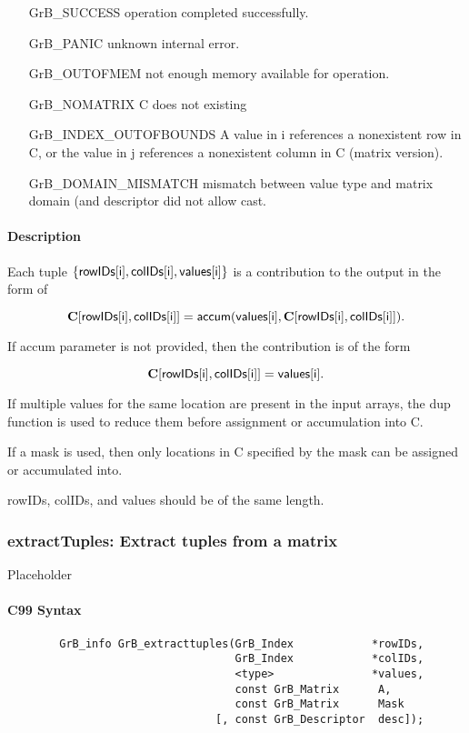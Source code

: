 \begin{itemize}[leftmargin=2.1in]
\item[{\sf GrB\_SUCCESS}] 	operation completed successfully.
\item[{\sf GrB\_PANIC}]	    unknown internal error.
\item[{\sf GrB\_OUTOFMEM}]	not enough memory available for operation.
\item[{\sf GrB\_NOMATRIX}]  C does not existing
\item[{\sf GrB\_INDEX\_OUTOFBOUNDS}]
        A value in i references a nonexistent row in C, or
	    the value in j references a nonexistent column in C (matrix version).
\item[\sf GrB\_DOMAIN\_MISMATCH]  
	   mismatch between value type and matrix domain (and descriptor did not allow cast.
\end{itemize}


\paragraph{Description}
Each tuple $\{ {\sf rowIDs[i]}, {\sf colIDs[i]}, {\sf values[i]}\}$ is a contribution to the output in the form of 

$${\bf C}[{\sf rowIDs[i]},{\sf colIDs[i]}] = {\sf accum}({\sf values[i]}, {\bf C}[{\sf rowIDs[i]}, {\sf colIDs[i]}]).$$

If {\sf accum} parameter is not provided, then the contribution is of the form 

$${\bf C}[{\sf rowIDs[i]}, {\sf colIDs[i]}] = {\sf values[i]}.$$

If multiple values for the same location are present in the input arrays, the 
dup function is used to reduce them before assignment or accumulation into {\sf C}.

If a mask is used, then only locations in {\sf C} specified by the mask can be assigned or
accumulated into.
 
{\sf rowIDs}, {\sf colIDs}, and {\sf values} should be of the same length. 


\subsubsection{{\sf extractTuples}: Extract tuples from a matrix}
\label{Sec:extractTuples}

Placeholder


\paragraph{C99 Syntax}

\begin{verbatim}
        GrB_info GrB_extracttuples(GrB_Index            *rowIDs,
                                   GrB_Index            *colIDs,
                                   <type>               *values, 
                                   const GrB_Matrix      A,
                                   const GrB_Matrix      Mask
                                [, const GrB_Descriptor  desc]);
\end{verbatim}
